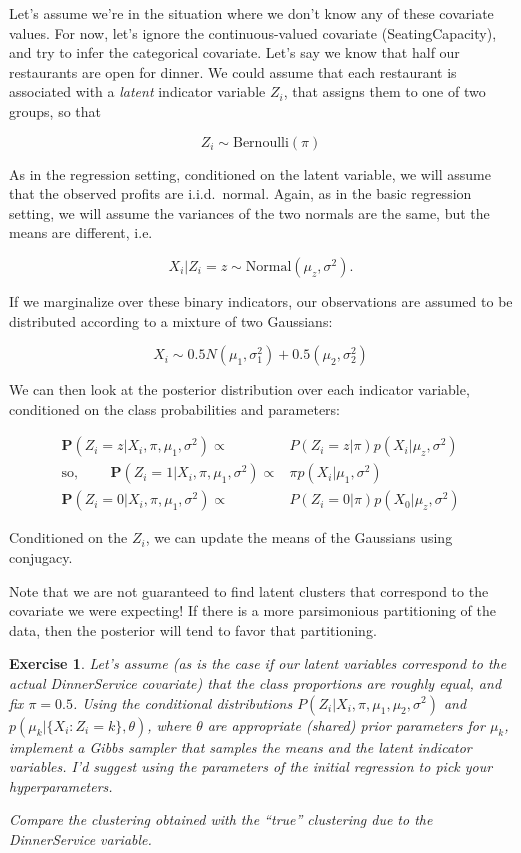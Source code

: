 \documentclass[twoside]{article}
\newcounter{lecnum}
\newtheorem{exercise}{Exercise}[lecnum]
\newcommand\Prob{\mathbf{P}}
\begin{document}
Let's assume we're in the situation where we don't know any of these covariate values. For now, let's ignore the continuous-valued covariate (SeatingCapacity), and try to infer the categorical covariate. Let's say we know that half our restaurants are open for dinner. We could assume that each restaurant is associated with a \textit{latent} indicator variable $Z_i$, that assigns them to one of two groups, so that

$$Z_i \sim \mbox{Bernoulli}(\pi)$$

As in the regression setting, conditioned on the latent variable, we will assume that the observed profits are i.i.d.\ normal. Again, as in the basic regression setting, we will assume the variances of the two normals are the same, but the means are different, i.e.

$$X_i|Z_i=z \sim \mbox{Normal}(\mu_{z}, \sigma^2).$$

If we marginalize over these binary indicators, our observations are assumed to be distributed according to a mixture of two Gaussians:

$$X_i \sim 0.5N(\mu_1,\sigma_1^2) + 0.5(\mu_2,\sigma_2^2)$$

We can then look at the posterior distribution over each indicator variable, conditioned on the class probabilities and parameters:

$$\begin{aligned}\Prob(Z_i = z|X_i, \pi, \mu_1,\sigma^2) \propto& P(Z_i=z|\pi)p(X_i|\mu_z,\sigma^2)\\
  \mbox{so, }\qquad \Prob(Z_i=1|X_i, \pi, \mu_1,\sigma^2) \propto& \pi p(X_i|\mu_1,\sigma^2)\\
  \Prob(Z_i=0|X_i, \pi, \mu_1,\sigma^2) \propto& P(Z_i=0|\pi)p(X_0|\mu_z,\sigma^2)
\end{aligned}$$

Conditioned on the $Z_i$, we can update the means of the Gaussians using conjugacy.

Note that we are not guaranteed to find latent clusters that correspond to the covariate we were expecting! If there is a more parsimonious partitioning of the data, then the posterior will tend to favor that partitioning.

\begin{exercise}
  Let's assume (as is the case if our latent variables correspond to the actual DinnerService covariate) that the class proportions are roughly equal, and fix $\pi=0.5$. Using the conditional distributions $P(Z_i|X_i,\pi,\mu_1,\mu_2,\sigma^2)$ and $p(\mu_k|\{X_i:Z_i=k\}, \theta)$, where $\theta$ are appropriate (shared) prior parameters for $\mu_k$, implement a Gibbs sampler that samples the means and the latent indicator variables. I'd suggest using the parameters of the initial regression to pick your hyperparameters.

  Compare the clustering obtained with the ``true'' clustering due to the DinnerService variable.
\end{exercise}
\end{document}
